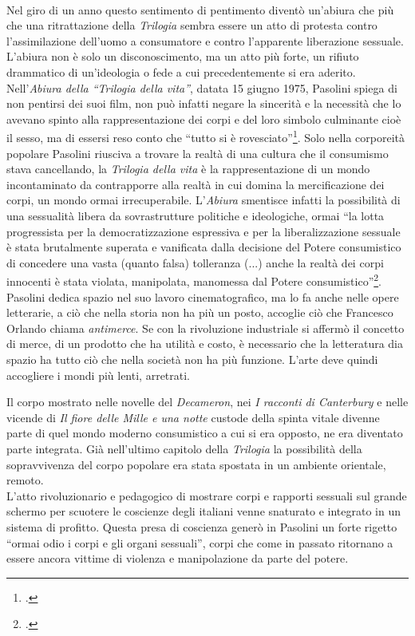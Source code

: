 \paragraph{}Nel giro di un anno questo sentimento di pentimento diventò un'abiura che più che una ritrattazione della \textit{Trilogia} sembra essere un atto di protesta contro l'assimilazione dell'uomo a consumatore e contro l'apparente liberazione sessuale.
L'abiura non è solo un disconoscimento, ma un atto più forte, un rifiuto drammatico di un'ideologia o fede a cui precedentemente si era aderito.
\\Nell'\textit{Abiura della \enquote{Trilogia della vita}}, datata 15 giugno 1975, Pasolini spiega di non pentirsi dei suoi film, non può infatti negare la sincerità e la necessità che lo avevano spinto alla rappresentazione dei corpi e del loro simbolo culminante cioè il sesso, ma di essersi reso conto che \enquote{tutto si è rovesciato}\footcite{Abiura}.
Solo nella corporeità popolare Pasolini riusciva a trovare la realtà di una cultura che il consumismo stava cancellando, la \textit{Trilogia della vita} è la rappresentazione di un mondo incontaminato da contrapporre alla realtà in cui domina la mercificazione dei corpi, un mondo ormai irrecuperabile.
L'\textit{Abiura} smentisce infatti la possibilità di una sessualità libera da sovrastrutture politiche e ideologiche, ormai \enquote{la lotta progressista per la democratizzazione espressiva e per la liberalizzazione sessuale è stata brutalmente superata e vanificata dalla decisione del Potere consumistico di concedere una vasta (quanto falsa) tolleranza (...) anche la realtà dei corpi innocenti è stata violata, manipolata, manomessa dal Potere consumistico}\footcite{Abiura}.
\\Pasolini dedica spazio nel suo lavoro cinematografico, ma lo fa anche nelle opere letterarie, a ciò che nella storia non ha più un posto, accoglie ciò che Francesco Orlando chiama \textit{antimerce}.
Se con la rivoluzione industriale si affermò il concetto di merce, di un prodotto che ha utilità e costo, è necessario che la letteratura dia spazio ha tutto ciò che nella società non ha più funzione.
L'arte deve quindi accogliere i mondi più lenti, arretrati.

Il corpo mostrato nelle novelle del \textit{Decameron}, nei \textit{I racconti di Canterbury} e nelle vicende di \textit{Il fiore delle Mille e una notte} custode della spinta vitale divenne parte di quel mondo moderno consumistico a cui si era opposto, ne era diventato parte integrata.
Già nell'ultimo capitolo della \textit{Trilogia} la possibilità della sopravvivenza del corpo popolare era stata spostata in un ambiente orientale, remoto.
\\L'atto rivoluzionario e pedagogico di mostrare corpi e rapporti sessuali sul grande schermo per scuotere le coscienze degli italiani venne snaturato e integrato in un sistema di profitto.
Questa presa di coscienza generò in Pasolini un forte rigetto \enquote{ormai odio i corpi e gli organi sessuali}, corpi che come in passato ritornano a essere ancora vittime di violenza e manipolazione da parte del potere.


